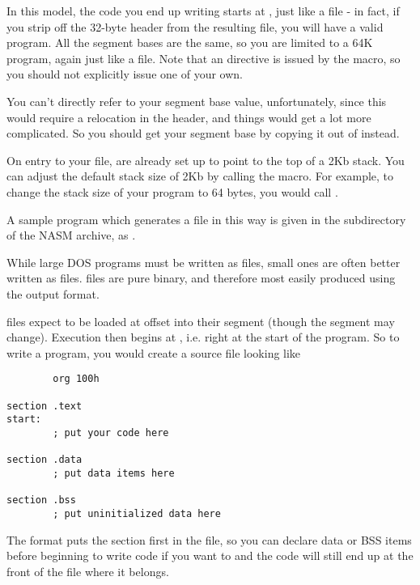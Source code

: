 In this model, the code you end up writing starts at , just
like a  file - in fact, if you strip off the 32-byte header
from the resulting  file, you will have a valid 
program. All the segment bases are the same, so you are limited to a
64K program, again just like a  file. Note that an 
directive is issued by the  macro, so you should not
explicitly issue one of your own.

You can't directly refer to your segment base value, unfortunately,
since this would require a relocation in the header, and things
would get a lot more complicated. So you should get your segment
base by copying it out of  instead.

On entry to your  file,  are already set up to
point to the top of a 2Kb stack. You can adjust the default stack
size of 2Kb by calling the  macro. For example, to
change the stack size of your program to 64 bytes, you would call
.

A sample program which generates a  file in this way is
given in the  subdirectory of the NASM archive, as
.


While large DOS programs must be written as  files, small
ones are often better written as  files.  files are
pure binary, and therefore most easily produced using the 
output format.


 files expect to be loaded at offset  into their
segment (though the segment may change). Execution then begins at
, i.e. right at the start of the program.
So to write a  program, you would create a source file
looking like

\begin{lstlisting}
        org 100h

section .text
start:
        ; put your code here

section .data
        ; put data items here

section .bss
        ; put uninitialized data here
\end{lstlisting}

The  format puts the  section first in the file,
so you can declare data or BSS items before beginning to write code if
you want to and the code will still end up at the front of the file
where it belongs.

